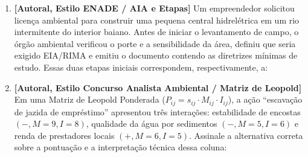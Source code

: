 \begin{enumerate}[leftmargin=1.8em, itemsep=6pt]
  \item \textbf{[Autoral, Estilo ENADE / AIA e Etapas]} Um empreendedor solicitou licença ambiental para construir uma pequena central hidrelétrica em um rio intermitente do interior baiano. Antes de iniciar o levantamento de campo, o órgão ambiental verificou o porte e a sensibilidade da área, definiu que seria exigido EIA/RIMA e emitiu o documento contendo as diretrizes mínimas de estudo. Essas duas etapas iniciais correspondem, respectivamente, a:
  \espacoResolucao[1.1cm]

  \item \textbf{[Autoral, Estilo Concurso Analista Ambiental / Matriz de Leopold]} Em uma Matriz de Leopold Ponderada ($P_{ij} = s_{ij} \cdot M_{ij} \cdot I_{ij}$), a ação ``escavação de jazida de empréstimo'' apresentou três interações: estabilidade de encostas $(-, M=9, I=8)$, qualidade da água por sedimentos $(-, M=5, I=6)$ e renda de prestadores locais $(+, M=6, I=5)$. Assinale a alternativa correta sobre a pontuação e a interpretação técnica dessa coluna:
  \espacoResolucao[1.2cm]


\end{enumerate}

